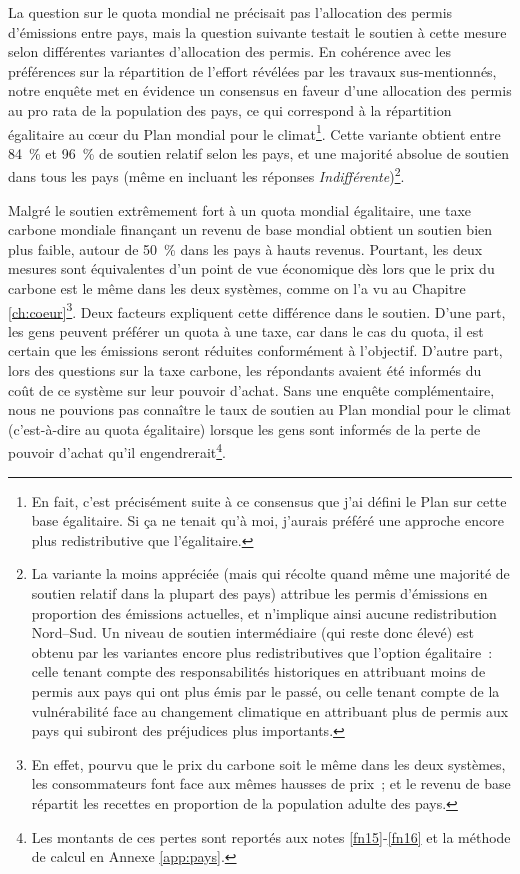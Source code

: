 \documentclass[a5paper,french,openany]{memoir}
\begin{document}
La question sur le quota mondial ne précisait pas l'allocation des permis d'émissions entre pays, mais la question suivante testait le soutien à cette mesure selon différentes variantes d'allocation des permis. En cohérence avec les préférences sur la répartition de l'effort révélées par les travaux sus-mentionnés, notre enquête met en évidence un consensus en faveur d'une allocation des permis au pro rata de la population des pays, ce qui correspond à la répartition égalitaire au cœur du Plan mondial pour le climat\footnote{En fait, c'est précisément suite à ce consensus que j'ai défini le Plan sur cette base égalitaire. Si ça ne tenait qu'à moi, j'aurais préféré une approche encore plus redistributive que l'égalitaire.}. Cette variante obtient entre 84~\% et 96~\% de soutien relatif selon les pays, et une majorité absolue de soutien dans tous les pays (même en incluant les réponses \textit{Indifférent\textperiodcentered{}e})\footnote{La variante la moins appréciée (mais qui récolte quand même une majorité de soutien relatif dans la plupart des pays) attribue les permis d'émissions en proportion des émissions actuelles, et n'implique ainsi aucune redistribution Nord--Sud. Un niveau de soutien intermédiaire (qui reste donc élevé) est obtenu par les variantes encore plus redistributives que l'option égalitaire~: celle tenant compte des responsabilités historiques en attribuant moins de permis aux pays qui ont plus émis par le passé, ou celle tenant compte de la vulnérabilité face au changement climatique en attribuant plus de permis aux pays qui subiront des préjudices plus importants.}.

Malgré le soutien extrêmement fort à un quota mondial égalitaire, une taxe carbone mondiale finançant un revenu de base mondial obtient un soutien bien plus faible, autour de 50~\% dans les pays à hauts revenus. Pourtant, les deux mesures sont équivalentes d'un point de vue économique dès lors que le prix du carbone est le même dans les deux systèmes, comme on l'a vu au Chapitre \ref{ch:coeur}\footnote{En effet, pourvu que le prix du carbone soit le même dans les deux systèmes, les consommateurs font face aux mêmes hausses de prix~; et le revenu de base répartit les recettes en proportion de la population adulte des pays.}. 
Deux facteurs expliquent cette différence dans le soutien. D'une part, les gens peuvent préférer un quota à une taxe, car dans le cas du quota, il est certain que les émissions seront réduites conformément à l'objectif. D'autre part, lors %
des questions sur la taxe carbone, %
les répondants avaient été informés 
du coût de ce système sur leur pouvoir d'achat. Sans une enquête complémentaire, nous ne pouvions pas connaître le taux de soutien au Plan mondial pour le climat (c'est-à-dire au quota égalitaire) lorsque les gens sont informés de la perte de pouvoir d'achat qu'il engendrerait\footnote{Les montants de ces pertes sont reportés aux notes \ref{fn15}-\ref{fn16} et la méthode de calcul en Annexe \ref{app:pays}.}.   
\end{document}
